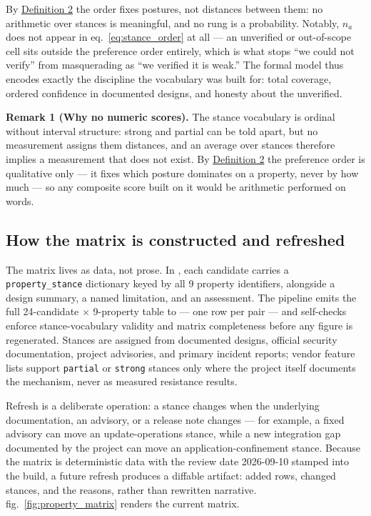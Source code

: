 \documentclass[
  english,
  9pt,
]{extarticle}
\begin{document}
By \hyperref[def:stance_order]{Definition 2} the order fixes postures,
not distances between them: no arithmetic over stances is meaningful,
and no rung is a probability. Notably, \(n_a\) does not appear in
eq.~\ref{eq:stance_order} at all --- an unverified or out-of-scope cell
sits outside the preference order entirely, which is what stops ``we
could not verify'' from masquerading as ``we verified it is weak.'' The
formal model thus encodes exactly the discipline the vocabulary was
built for: total coverage, ordered confidence in documented designs, and
honesty about the unverified.

\protect{}\label{rem:anti_scoring}
\textbf{Remark 1 (Why no numeric scores).} The stance vocabulary is
ordinal without interval structure: strong and partial can be told
apart, but no measurement assigns them distances, and an average over
stances therefore implies a measurement that does not exist. By
\hyperref[def:stance_order]{Definition 2} the preference order is
qualitative only --- it fixes which posture dominates on a property,
never by how much --- so any composite score built on it would be
arithmetic performed on words.

\subsection{How the matrix is constructed and
refreshed}\label{how-the-matrix-is-constructed-and-refreshed}

The matrix lives as data, not prose. In
, each candidate carries a
\texttt{property\_stance} dictionary keyed by all 9 property
identifiers, alongside a design summary, a named limitation, and an
assessment. The pipeline emits the full 24-candidate \texorpdfstring{\ensuremath{\times}}{x} 9-property table
to  --- one row per pair ---
and self-checks enforce stance-vocabulary validity and matrix
completeness before any figure is regenerated. Stances are assigned from
documented designs, official security documentation, project advisories,
and primary incident reports; vendor feature lists support
\texttt{partial} or \texttt{strong} stances only where the project
itself documents the mechanism, never as measured resistance results.

Refresh is a deliberate operation: a stance changes when the underlying
documentation, an advisory, or a release note changes --- for example, a
fixed advisory can move an update-operations stance, while a new
integration gap documented by the project can move an
application-confinement stance. Because the matrix is deterministic data
with the review date 2026-09-10 stamped into the build, a future refresh
produces a diffable artifact: added rows, changed stances, and the
reasons, rather than rewritten narrative. fig.~\ref{fig:property_matrix}
renders the current matrix.
\end{document}
